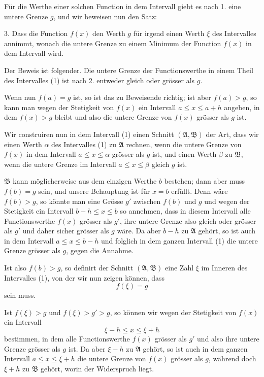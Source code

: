 \documentclass[11pt]{article}
\begin{document}
Für die Werthe einer solchen Function in dem Intervall giebt es nach 1. eine untere Grenze $g$, und wir beweisen nun den Satz:

3. Dass die Function $f(x)$ den Werth $g$ für irgend einen Werth $\xi$ des Intervalles annimmt, wonach die untere Grenze zu einem Minimum der Function $f(x)$ in dem Intervall wird.

Der Beweis ist folgender. Die untere Grenze der Functionswerthe in einem Theil des Intervalles (1) ist nach 2. entweder gleich oder grösser als $g$.

Wenn nun $f(a)=g$ ist, so ist das zu Beweisende richtig; ist aber $f(a)>g$, so kann man wegen der Stetigkeit von $f(x)$ ein Intervall $a\le x\le a+h$ angeben, in dem $f(x)>g$ bleibt und also die untere Grenze von $f(x)$ grösser als $g$ ist.

Wir construiren nun in dem Intervall (1) einen Schnitt $(\mathfrak A,\mathfrak B)$ der Art, dass wir einen Werth $\alpha$ des Intervalles (1) zu $\mathfrak A$ rechnen, wenn die untere Grenze von $f(x)$ in dem Intervall $a\le x\le \alpha$ grösser als $g$ ist, und einen Werth $\beta$ zu $\mathfrak B$, wenn die untere Grenze im Intervall $a\le x\le \beta$ gleich $g$ ist.

$\mathfrak B$ kann möglicherweise aus dem einzigen Werthe $b$ bestehen; dann aber muss $f(b)=g$ sein, und unsere Behauptung ist für $x=b$ erfüllt. Denn wäre $f(b)>g$, so könnte man eine Grösse $g'$ zwischen $f(b)$ und $g$ und wegen der Stetigkeit ein Intervall $b-h\le x\le b$ so annehmen, dass in diesem Intervall alle Functionswerthe $f(x)$ grösser als $g'$, ihre untere Grenze also gleich oder grösser als $g'$ und daher sicher grösser als $g$ wäre. Da aber $b-h$ zu $\mathfrak A$ gehört, so ist auch in dem Intervall $a\le x\le b-h$ und folglich in dem ganzen Intervall (1) die untere Grenze grösser als $g$, gegen die Annahme.

Ist also $f(b)>g$, so definirt der Schnitt $(\mathfrak A,\mathfrak B)$ eine Zahl $\xi$ im Inneren des Intervalles (1), von der wir nun zeigen können, dass
\begin{equation}
 f(\xi)=g
\tag{3}
\end{equation}
sein muss.

Ist $f(\xi)>g$ und $f(\xi)>g'>g$, so können wir wegen der Stetigkeit von $f(x)$ ein Intervall
\[
 \xi-h\le x\le \xi+h
\]
bestimmen, in dem alle Functionswerthe $f(x)$ grösser als $g'$ und also ihre untere Grenze grösser als $g$ ist. Da aber $\xi-h$ zu $\mathfrak A$ gehört, so ist auch in dem ganzen Intervall $a\le x\le \xi+h$ die untere Grenze von $f(x)$ grösser als $g$, während doch $\xi+h$ zu $\mathfrak B$ gehört, worin der Widerspruch liegt.
\end{document}
